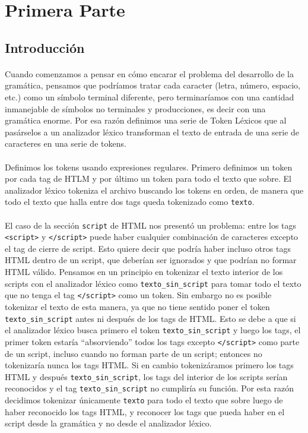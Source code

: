 \section{Primera Parte}
\subsection{Introducci\'on}


\paragraph{} Cuando comenzamos a pensar en cómo encarar el problema del desarrollo de la gramática, pensamos que podríamos tratar cada caracter (letra, número, espacio, etc.) como un símbolo terminal diferente, pero terminaríamos con una cantidad inmanejable de símbolos no terminales y producciones, es decir con una gramática enorme. Por esa razón definimos una serie de Token Léxicos que al pasárselos a un analizador léxico transforman el texto de entrada de una serie de caracteres en una serie de tokens.

\paragraph{} Definimos los tokens usando expresiones regulares. Primero definimos un token por cada tag de HTLM y por último un token para todo el texto que sobre. El analizador léxico tokeniza el archivo buscando los tokens en orden, de manera que todo el texto que halla entre dos tags queda tokenizado como \verb|texto|.

\paragraph{} El caso de la sección \verb|script| de HTML nos presentó un problema: entre los tags \verb|<script>| y \verb|</script>| puede haber cualquier combinación de caracteres excepto el tag de cierre de script. Esto quiere decir que podría haber incluso otros tags HTML dentro de un script, que deberían ser ignorados y que podrían no formar HTML válido. Pensamos en un principio en tokenizar el texto interior de los scripts con el analizador léxico como \verb|texto_sin_script| para tomar todo el texto que no tenga el tag \verb|</script>| como un token. Sin embargo no es posible tokenizar el texto de esta manera, ya que no tiene sentido poner el token \verb|texto_sin_script| antes ni después de los tags de HTML. 
Esto se debe a que si el analizador léxico busca primero el token \verb|texto_sin_script| y luego los tags, el primer token estaría ``absorviendo'' todos los tags excepto \verb|</script>| como parte de un script, incluso cuando no forman parte de un script; entonces no tokenizaría nunca los tags HTML. Si en cambio tokenizáramos primero los tags HTML y después \verb|texto_sin_script|, los tags del interior de los scripts serían reconocidos y el tag \verb|texto_sin_script| no cumpliría su función. Por esta razón decidimos tokenizar únicamente \verb|texto| para todo el texto que sobre luego de haber reconocido los tags HTML, y reconocer los tags que pueda haber en el script desde la gramática y no desde el analizador léxico.

